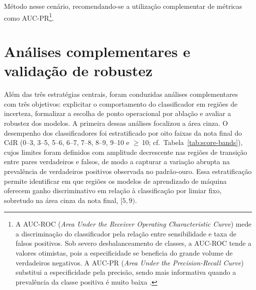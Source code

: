 \begin{chapter}{Método}
nesse cenário, recomendando-se a utilização complementar de métricas como AUC-PR\footnote{A AUC-ROC (\textit{Area Under the Receiver Operating Characteristic Curve}) mede a discriminação do classificador pela relação entre sensibilidade e taxa de falsos positivos. Sob severo desbalanceamento de classes, a AUC-ROC tende a valores otimistas, pois a especificidade se beneficia do grande volume de verdadeiros negativos. A AUC-PR (\textit{Area Under the Precision-Recall Curve}) substitui a especificidade pela precisão, sendo mais informativa quando a prevalência da classe positiva é muito baixa \cite{Davis2006aucpr, Saito2015aucpr}.}.

\section{Análises complementares e validação de robustez}\label{sec:analises-complementares}

Além das três estratégias centrais, foram conduzidas análises complementares com três objetivos: explicitar o comportamento do classificador em regiões de incerteza, formalizar a escolha de ponto operacional por ablação e avaliar a robustez dos modelos. A primeira dessas análises focalizou a área cinza. O desempenho dos classificadores foi estratificado por oito faixas da nota final do CdR (0--3, 3--5, 5--6, 6--7, 7--8, 8--9, 9--10 e $\geq$\,10; cf.\ Tabela~\ref{tab:score-bands}), cujos limites foram definidos com amplitude decrescente nas regiões de transição entre pares verdadeiros e falsos, de modo a capturar a variação abrupta na prevalência de verdadeiros positivos observada no padrão-ouro. Essa estratificação permite identificar em que regiões os modelos de aprendizado de máquina oferecem ganho discriminativo em relação à classificação por limiar fixo, sobretudo na área cinza da nota final, $[5,9)$.


\end{chapter}
